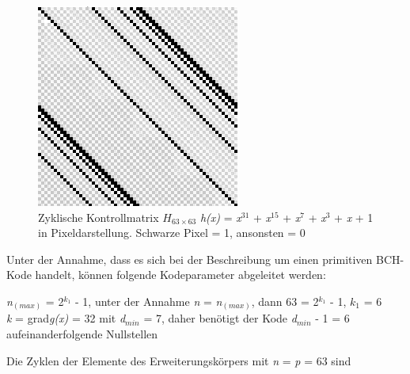 \documentclass[11pt,a4paper]{article}
\begin{document}
\begin{figure}
	\includegraphics[width=\linewidth]{hmatrix.png}
	\caption{Zyklische Kontrollmatrix $H_{63 \times 63}$ \textit{h(x)} = \textit{x$^{31}$} + \textit{x$^{15}$} + \textit{x$^{7}$} + \textit{x$^{3}$} + \textit{x} + 1  in Pixeldarstellung. Schwarze Pixel = 1, ansonsten = 0}
	\label{fig:HK_G_H}
\end{figure}


Unter der Annahme, dass es sich bei der Beschreibung um einen primitiven BCH-Kode handelt, können folgende Kodeparameter abgeleitet werden: 

\textit{n$_{(max)}$} = 2\textit{$^{k_{1}}$} - 1, unter der Annahme \textit{n} = \textit{n$_{(max)}$}, dann 63 = 2\textit{$^{k_{1}}$} - 1, \textit{$k_{1}$} = 6 \\
\textit{k} = grad\textit{g(x)} = 32
mit \textit{d$_{min}$} = 7, daher benötigt der Kode \textit{d$_{min}$} - 1 = 6 aufeinanderfolgende Nullstellen

Die Zyklen der Elemente des Erweiterungskörpers mit \textit{n} = \textit{p} = 63 sind \\
\end{document}
